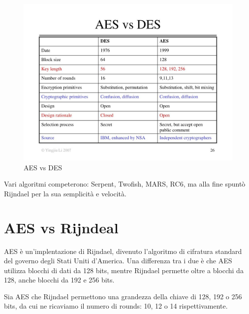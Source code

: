 \begin{figure}[H]
	\centering
	\includegraphics[width=1\textwidth, height=1\textheight, keepaspectratio]{./images/des_vs_aes/aes-vs-des.png}
	\caption{AES vs DES}
	\label{fig:aes_vs_des}
\end{figure}

\textsf{\small Vari algoritmi competerono: Serpent, Twofish, MARS, RC6, ma alla fine spuntò Rijndael per la sua semplicità e velocità.} %



\section{AES vs Rijndeal}

\textsf{\small AES è un'implentazione di Rijndael, divenuto l'algoritmo di cifratura standard del governo degli Stati Uniti d'America.}
\textsf{\small Una differenza tra i due è che AES utilizza blocchi di dati da 128 bits, mentre Rijndael permette oltre a blocchi da 128, anche blocchi da 192 e 256 bits.} %

\textsf{\small Sia AES che Rijndael permettono una grandezza della chiave di 128, 192 o 256 bits, da cui ne ricaviamo il numero di rounds: 10, 12 o 14 rispettivamente.}

